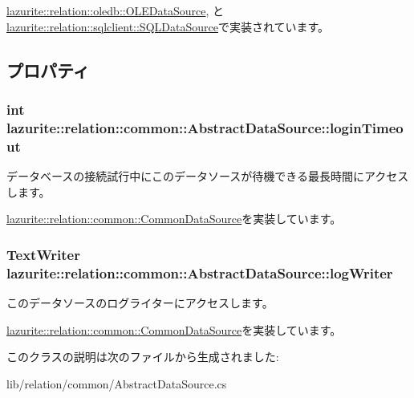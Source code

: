 \hyperlink{classlazurite_1_1relation_1_1oledb_1_1_o_l_e_data_source_a7dbd44842590d2d1f11a6ddca7a393b7}{lazurite::relation::oledb::OLEDataSource}, と \hyperlink{classlazurite_1_1relation_1_1sqlclient_1_1_s_q_l_data_source_a99a7bdaa7ca6fce82a89f537a72b2e23}{lazurite::relation::sqlclient::SQLDataSource}で実装されています。

\subsection{プロパティ}
\hypertarget{classlazurite_1_1relation_1_1common_1_1_abstract_data_source_a95357e4aa2578c81c55805ef877f6694}{
\subsubsection[{loginTimeout}]{\setlength{\rightskip}{0pt plus 5cm}int lazurite::relation::common::AbstractDataSource::loginTimeout}}
\label{classlazurite_1_1relation_1_1common_1_1_abstract_data_source_a95357e4aa2578c81c55805ef877f6694}


データベースの接続試行中にこのデータソースが待機できる最長時間にアクセスします。 

\hyperlink{interfacelazurite_1_1relation_1_1common_1_1_common_data_source_a3fa02340190e1fed4b3cc28d87ce6908}{lazurite::relation::common::CommonDataSource}を実装しています。\hypertarget{classlazurite_1_1relation_1_1common_1_1_abstract_data_source_ac0df2dbaf0813abab29a34aad40a7e12}{
\subsubsection[{logWriter}]{\setlength{\rightskip}{0pt plus 5cm}TextWriter lazurite::relation::common::AbstractDataSource::logWriter}}
\label{classlazurite_1_1relation_1_1common_1_1_abstract_data_source_ac0df2dbaf0813abab29a34aad40a7e12}


このデータソースのログライターにアクセスします。 

\hyperlink{interfacelazurite_1_1relation_1_1common_1_1_common_data_source_a727c10810a495b3264cd6bda3417522e}{lazurite::relation::common::CommonDataSource}を実装しています。

このクラスの説明は次のファイルから生成されました:\begin{DoxyCompactItemize}
\item 
lib/relation/common/AbstractDataSource.cs\end{DoxyCompactItemize}
